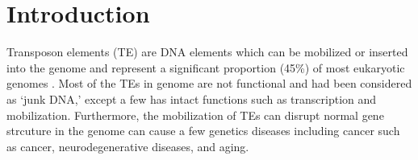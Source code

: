 \documentclass{ws-procs11x85}
\begin{document}

\bodymatter

\section{Introduction}\label{aba:intro}

Transposon elements (TE) are DNA elements which can be mobilized or inserted into the genome and represent a significant proportion (45\%) of most eukaryotic genomes \cite{erwin2014mobile}. 
Most of the TEs in genome are not functional and had been considered as `junk DNA,' except a few has intact functions such as transcription and mobilization.\cite{biemont2006genetics}
Furthermore, the mobilization of TEs can disrupt normal gene strcuture in the genome can cause a few genetics diseases including cancer \cite{belancio2008mammalian} such as cancer,
\cite{jirtle2007environmental}
neurodegenerative diseases,\cite{erwin2014mobile} and aging.\cite{wood2013chromatin} %
\end{document}
